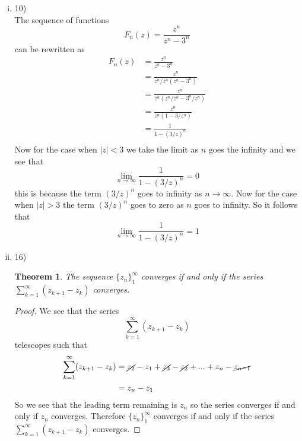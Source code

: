 \documentclass[11pt]{article}
\begin{document}
\begin{enumerate}
\begin{enumerate}[(i)]
\item 10)\\
The sequence of functions
$$F_n(z) = \frac{z^n}{z^n-3^n}$$
can be rewritten as
\begin{align*}
F_n(z) &= \frac{z^n}{z^n-3^n}\\
&= \frac{z^n}{z^n/z^n(z^n-3^n)}\\
&= \frac{z^n}{z^n(z^n/z^n-3^n/z^n)}\\
&= \frac{z^n}{z^n(1-{3}/{z}^n)}\\
&= \frac{1}{1-({3}/{z})^n}\\
\end{align*}
Now for the case when $|z|<3$ we take the limit as $n$ goes the infinity and we see that
$$\lim_{n\rightarrow\infty}\frac{1}{1-({3}/{z})^n} = 0$$
this is because the term $(3/z)^n$ goes to infinity as $n\rightarrow\infty$. Now for the case when $|z|>3$ the term $(3/z)^n$ goes to zero as $n$ goes to infinity. So it follows that
$$\lim_{n\rightarrow\infty}\frac{1}{1-({3}/{z})^n} = 1$$

\item 16)
\newtheorem{theo16}{Theorem}
\begin{theo16}
The sequence $\{z_n\}_1^{\infty}$ converges if and only if the series $\sum_{k=1}^{\infty}(z_{k+1}-z_k)$ converges.
\end{theo16}
\begin{proof}
We see that the series
$$\sum_{k=1}^{\infty}(z_{k+1}-z_k)$$
telescopes such that 
\begin{align*}
\sum_{k=1}^{\infty}(z_{k+1}-z_k) &= \cancel{z_2}-z_1+\cancel{z_3}-\cancel{z_2}+...+z_{n}-\cancel{z_{n-1}}\\
&= z_n - z_1
\end{align*}
So we see that the leading term remaining is $z_n$ so the series converges if and only if $z_n$ converges. Therefore $\{z_n\}_1^{\infty}$ converges if and only if the series $\sum_{k=1}^{\infty}(z_{k+1}-z_k)$ converges.
\end{proof}

\end{enumerate}


\end{enumerate}
\end{document}
